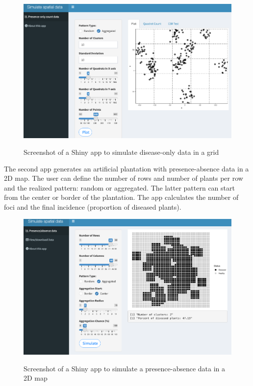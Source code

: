 \documentclass[
  letterpaper,
  DIV=11,
  numbers=noendperiod]{scrreprt}
\begin{document}
\begin{figure}

{\centering 

\href{https://delponte.shinyapps.io/spatial/}{\includegraphics[width=5.42708in,height=\textheight]{imgs/spatial_shiny.png}}

}

\caption{\label{fig-spatial1}Screenshot of a Shiny app to simulate
disease-only data in a grid}

\end{figure}

The second app generates an artificial plantation with presence-absence
data in a 2D map. The user can define the number of rows and number of
plants per row and the realized pattern: random or aggregated. The
latter pattern can start from the center or border of the plantation.
The app calculates the number of foci and the final incidence
(proportion of diseased plants).

\begin{figure}

{\centering 

\href{https://delponte.shinyapps.io/spatial2}{\includegraphics[width=5.42708in,height=\textheight]{imgs/spatial2_shiny.png}}

}

\caption{\label{fig-spatial2}Screenshot of a Shiny app to simulate a
presence-absence data in a 2D map}

\end{figure}
\end{document}
